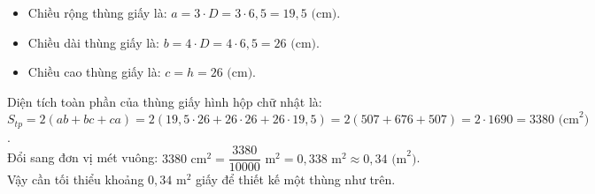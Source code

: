 \begin{bt}
{\begin{enumerate}[a)]
	\begin{itemize}
		\item Chiều rộng thùng giấy là: $a = 3\cdot D = 3\cdot 6{,}5 = 19{,}5\text{ (cm)}$.
		\item Chiều dài thùng giấy là: $b = 4\cdot D = 4\cdot 6{,}5 = 26\text{ (cm)}$.
		\item Chiều cao thùng giấy là: $c = h = 26\text{ (cm)}$.
	\end{itemize}
	Diện tích toàn phần của thùng giấy hình hộp chữ nhật là:
	$S_{tp} = 2(ab + bc + ca) = 2(19{,}5\cdot 26 + 26\cdot 26 + 26\cdot 19{,}5) = 2(507 + 676 + 507) = 2\cdot 1690 = 3380\text{ (cm}^2\text{)}$.\\
	Đổi sang đơn vị mét vuông:
	$3380\text{ cm}^2 = \dfrac{3380}{10000}\text{ m}^2 = 0{,}338\text{ m}^2 \approx 0{,}34\text{ (m}^2\text{)}$.\\
	Vậy cần tối thiểu khoảng $0{,}34\text{ m}^2$ giấy để thiết kế một thùng như trên.
\end{enumerate}
}
\end{bt}


